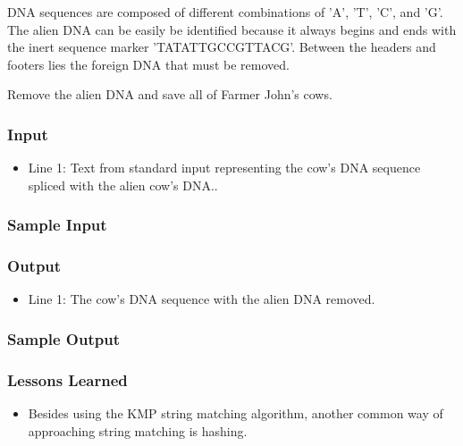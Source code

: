 DNA sequences are composed of different combinations of 'A', 'T', 'C', and 'G'.
The alien DNA can be easily be identified because it always begins and ends with the inert sequence marker \mbox{'TATATTGCCGTTACG'}.
Between the headers and footers lies the foreign DNA that must be removed.

Remove the alien DNA and save all of Farmer John's cows.

\subsubsection{Input}
\begin{itemize}
\item Line 1: Text from standard input representing the cow's DNA sequence spliced with the alien cow's DNA..
\end{itemize}

\subsubsection{Sample Input}


\subsubsection{Output}
\begin{itemize}
\item Line 1: The cow's DNA sequence with the alien DNA removed.
\end{itemize}

\subsubsection{Sample Output}


\subsubsection{Lessons Learned}
\begin{itemize}
	\item Besides using the KMP string matching algorithm, another common way of approaching string matching is hashing.
\end{itemize}


